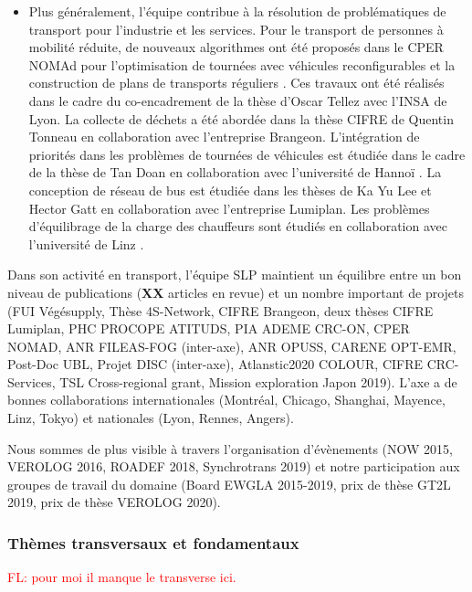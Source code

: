 \begin{itemize}
    \item Plus généralement, l'équipe contribue à la résolution de problématiques de transport pour l'industrie et les services. Pour le transport de personnes à mobilité réduite, de nouveaux algorithmes ont été proposés dans le CPER NOMAd pour l'optimisation de tournées avec véhicules reconfigurables \cite{tellez:hal-01768291} et la construction de plans de transports réguliers \cite{tellez:hal-02460670}. 
    Ces travaux ont été réalisés dans le cadre du co-encadrement de la thèse d'Oscar Tellez avec l'INSA de Lyon. 
    La collecte de déchets a été abordée dans la thèse CIFRE de Quentin Tonneau \cite{tonneau:hal-01621297, tonneau:tel-01729672} en collaboration avec l'entreprise Brangeon. 
    L'intégration de priorités dans les problèmes de  tournées de véhicules est étudiée dans le cadre de la thèse de Tan Doan en collaboration avec l'université de Hannoï \cite{}. 
    La conception de réseau de bus est étudiée dans les thèses de Ka Yu Lee \cite{lee:hal-01626949} et Hector Gatt en collaboration avec l'entreprise Lumiplan.
    Les problèmes d'équilibrage de la charge des chauffeurs sont étudiés en collaboration avec l'université de Linz \cite{lehuede:hal-02296076}.
\end{itemize}

Dans son activité en transport, l'équipe SLP maintient un équilibre entre  un bon niveau de publications (\textbf{XX} articles en revue) et un nombre important de projets (FUI Végésupply, Thèse 4S-Network, CIFRE Brangeon, deux thèses CIFRE Lumiplan, PHC PROCOPE ATITUDS, PIA ADEME CRC-ON, CPER NOMAD, ANR FILEAS-FOG (inter-axe), ANR OPUSS, CARENE OPT-EMR, Post-Doc UBL, Projet DISC (inter-axe), Atlanstic2020 COLOUR, CIFRE CRC-Services, TSL Cross-regional grant, Mission exploration Japon 2019). 
L'axe a de bonnes collaborations internationales (Montréal, Chicago, Shanghai, Mayence, Linz, Tokyo) et nationales (Lyon, Rennes, Angers). 

Nous sommes de plus visible à travers l'organisation d'évènements (NOW 2015, VEROLOG 2016, ROADEF 2018, Synchrotrans 2019) et notre participation aux groupes de travail du domaine (Board EWGLA 2015-2019, prix de thèse GT2L 2019, prix de thèse VEROLOG 2020).

\subsubsection{Thèmes transversaux et fondamentaux}

\textcolor{red}{FL: pour moi il manque le transverse ici. }
  
